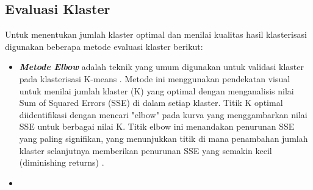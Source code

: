 \subsection{Evaluasi Klaster}
Untuk menentukan jumlah klaster optimal dan menilai kualitas hasil klasterisasi digunakan beberapa metode evaluasi klaster berikut:
\begin{itemize}
    \item \textbf{\textit{Metode Elbow}} adalah teknik yang umum digunakan untuk validasi klaster pada klasterisasi K-means \parencite{Son2025}. Metode ini menggunakan pendekatan visual untuk menilai jumlah klaster (K) yang optimal dengan menganalisis nilai Sum of Squared Errors (SSE) di dalam setiap klaster. Titik K optimal diidentifikasi dengan mencari "elbow" pada kurva yang menggambarkan nilai SSE untuk berbagai nilai K. Titik elbow ini menandakan penurunan SSE yang paling signifikan, yang menunjukkan titik di mana penambahan jumlah klaster selanjutnya memberikan penurunan SSE yang semakin kecil (diminishing returns) \parencite{Sugar2003,Umargono2020}.
    \item 
\end{itemize}

